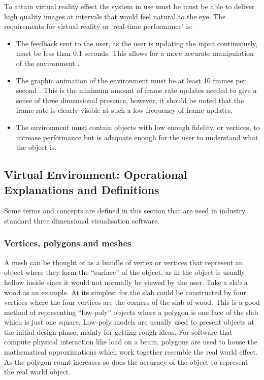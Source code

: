 To attain virtual reality effect the system in use must be must be able to deliver high quality images at intervals that would feel natural to the eye. The requirements for virtual reality or `real-time performance' \cite{bryson1996virtual} is:
\begin{itemize}
    \item The feedback sent to the user, as the user is updating the input continuously, must be less than 0.1 seconds. This allows for a more accurate manipulation of the environment \cite{sheridan1974man}. 
    \item The graphic animation of the environment must be at least 10 frames per second \cite{bryson1996virtual}. This is the minimum amount of frame rate updates needed to give a sense of three dimensional presence, however, it should be noted that the frame rate is clearly visible at such a low frequency of frame updates. 
    \item The environment must contain objects with low enough fidelity, or vertices, to increase performance but is adequate enough for the user to understand what the object is.
\end{itemize}

\subsection{Virtual Environment: Operational Explanations and Definitions}

Some terms and concepts are defined in this section that are used in industry standard three dimensional visualisation software.

\subsubsection{Vertices, polygons and meshes}
A mesh can be thought of as a bundle of vertex or vertices that represent an object where they form the ``surface'' of the object, as in the object is usually hollow inside since it would not normally be viewed by the user. Take a slab a wood as an example. At its simplest for the slab could be constructed by four vertices where the four vertices are the corners of the slab of wood. This is a good method of representing ``low-poly'' objects where a polygon is one face of the slab which is just one square. Low-poly models are usually used to present objects at the initial design phase, mainly for getting rough ideas. For software that compute physical interaction like load on a beam, polygons are used to house the mathematical approximations which work together resemble the real world effect. As the polygon count increases so does the accuracy of the object to represent the real world object.

